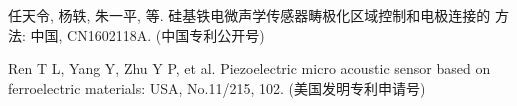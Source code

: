 \documentclass[degree=doctor]{thuthesis}
\begin{document}
\begin{resume}
  \begin{achievements}
    \item 任天令, 杨轶, 朱一平, 等. 硅基铁电微声学传感器畴极化区域控制和电极连接的
      方法: 中国, CN1602118A. (中国专利公开号)
    \item Ren T L, Yang Y, Zhu Y P, et al. Piezoelectric micro acoustic sensor
      based on ferroelectric materials: USA, No.11/215, 102. (美国发明专利申请号)
  \end{achievements}

\end{resume}

\clearpage
\OMIT
\end{document}
